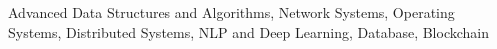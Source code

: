 Advanced Data Structures and Algorithms, Network
Systems, Operating Systems, Distributed Systems, NLP and Deep Learning, Database, Blockchain
